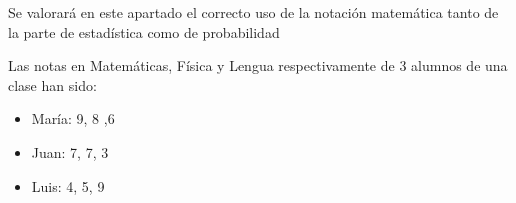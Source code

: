 \documentclass[addpoints,spanish, 12pt,a4paper]{exam}
\begin{document}
\begin{questions}

\question[1] Se valorará en este apartado el correcto uso de la notación matemática tanto de la parte de estadística como de probabilidad

\question Las notas en Matemáticas, Física y Lengua respectivamente de 3 alumnos de una clase han sido:
\begin{itemize}
    \item María: 9, 8 ,6
    \item Juan: 7, 7, 3
    \item Luis: 4, 5, 9
\end{itemize}

\end{questions}
\end{document}
